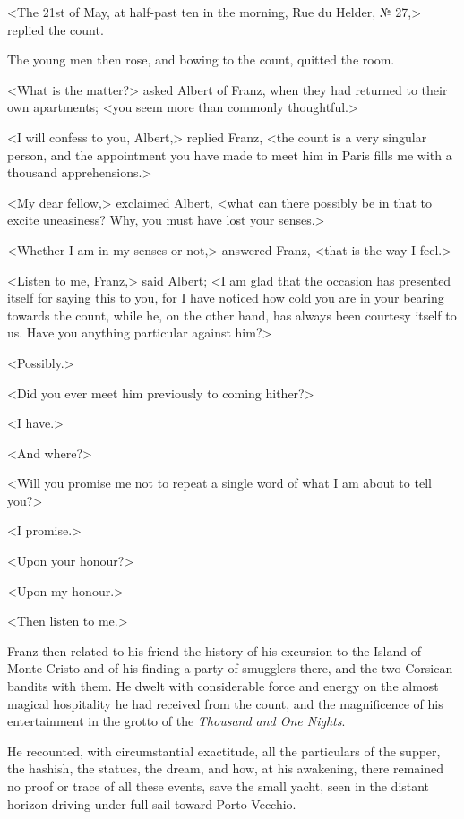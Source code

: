  <The 21st of May, at half-past ten in the morning, Rue du Helder, № 27,> replied the count. 

 The young men then rose, and bowing to the count, quitted the room. 

 <What is the matter?> asked Albert of Franz, when they had returned to their own apartments; <you seem more than commonly thoughtful.> 

 <I will confess to you, Albert,> replied Franz, <the count is a very singular person, and the appointment you have made to meet him in Paris fills me with a thousand apprehensions.> 

 <My dear fellow,> exclaimed Albert, <what can there possibly be in that to excite uneasiness? Why, you must have lost your senses.> 

 <Whether I am in my senses or not,> answered Franz, <that is the way I feel.> 

 <Listen to me, Franz,> said Albert; <I am glad that the occasion has presented itself for saying this to you, for I have noticed how cold you are in your bearing towards the count, while he, on the other hand, has always been courtesy itself to us. Have you anything particular against him?> 

 <Possibly.> 

 <Did you ever meet him previously to coming hither?> 

 <I have.> 

 <And where?> 

 <Will you promise me not to repeat a single word of what I am about to tell you?> 

 <I promise.> 

 <Upon your honour?> 

 <Upon my honour.> 

 <Then listen to me.> 

 Franz then related to his friend the history of his excursion to the Island of Monte Cristo and of his finding a party of smugglers there, and the two Corsican bandits with them. He dwelt with considerable force and energy on the almost magical hospitality he had received from the count, and the magnificence of his entertainment in the grotto of the \textit{Thousand and One Nights}. 

 He recounted, with circumstantial exactitude, all the particulars of the supper, the hashish, the statues, the dream, and how, at his awakening, there remained no proof or trace of all these events, save the small yacht, seen in the distant horizon driving under full sail toward Porto-Vecchio. 


